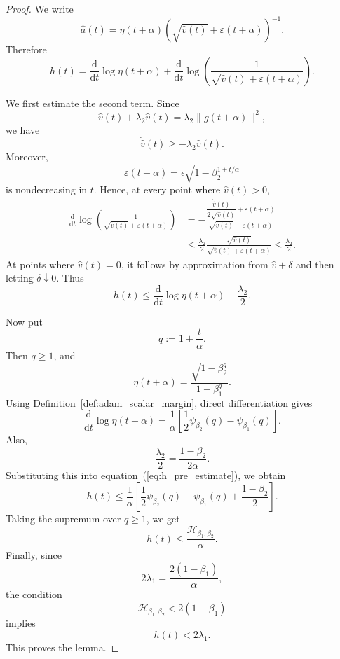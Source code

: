 \documentclass{article} %
\begin{document}
\begin{proof}
We write
\[
    \widehat a(t)
    =
    \eta(t+\alpha)
    \left(\sqrt{\widehat v(t)}+\varepsilon(t+\alpha)\right)^{-1}.
\]
Therefore
\[
    h(t)
    =
    \frac{\mathrm d}{\mathrm dt}\log\eta(t+\alpha)
    +
    \frac{\mathrm d}{\mathrm dt}
    \log
    \left(
        \frac{1}{\sqrt{\widehat v(t)}+\varepsilon(t+\alpha)}
    \right).
\]

We first estimate the second term. Since
\[
    \dot{\widehat v}(t)+\lambda_2\widehat v(t)
    =
    \lambda_2\|g(t+\alpha)\|^2,
\]
we have
\[
    \dot{\widehat v}(t)\geq -\lambda_2\widehat v(t).
\]
Moreover,
\[
    \varepsilon(t+\alpha)
    =
    \epsilon\sqrt{1-\beta_2^{1+t/\alpha}}
\]
is nondecreasing in \(t\). Hence, at every point where \(\widehat v(t)>0\),
\[
\begin{aligned}
    \frac{\mathrm d}{\mathrm dt}
    \log
    \left(
        \frac{1}{\sqrt{\widehat v(t)}+\varepsilon(t+\alpha)}
    \right)
    &=
    -
    \frac{
        \dfrac{\dot{\widehat v}(t)}{2\sqrt{\widehat v(t)}}
        +
        \dot\varepsilon(t+\alpha)
    }
    {
        \sqrt{\widehat v(t)}+\varepsilon(t+\alpha)
    }\\
    &\leq
    \frac{\lambda_2}{2}
    \frac{\sqrt{\widehat v(t)}}
    {\sqrt{\widehat v(t)}+\varepsilon(t+\alpha)}
    \leq
    \frac{\lambda_2}{2}.
\end{aligned}
\]
At points where \(\widehat v(t)=0\), it follows by approximation from \(\widehat v+\delta\) and then letting \(\delta\downarrow0\). Thus
\begin{equation}\label{eq:h_pre_estimate}
    h(t)
    \leq
    \frac{\mathrm d}{\mathrm dt}\log\eta(t+\alpha)
    +
    \frac{\lambda_2}{2}.
\end{equation}

Now put
\[
    q:=1+\frac{t}{\alpha}.
\]
Then \(q\geq1\), and
\[
    \eta(t+\alpha)
    =
    \frac{\sqrt{1-\beta_2^q}}
    {1-\beta_1^q}.
\]
Using Definition~\ref{def:adam_scalar_margin}, direct differentiation gives
\[
    \frac{\mathrm d}{\mathrm dt}\log\eta(t+\alpha)
    =
    \frac1\alpha
    \left[
        \frac12\psi_{\beta_2}(q)
        -
        \psi_{\beta_1}(q)
    \right].
\]
Also,
\[
    \frac{\lambda_2}{2}
    =
    \frac{1-\beta_2}{2\alpha}.
\]
Substituting this into equation~(\ref{eq:h_pre_estimate}), we obtain
\[
    h(t)
    \leq
    \frac1\alpha
    \left[
        \frac12\psi_{\beta_2}(q)
        -
        \psi_{\beta_1}(q)
        +
        \frac{1-\beta_2}{2}
    \right].
\]
Taking the supremum over \(q\geq1\), we get
\[
    h(t)
    \leq
    \frac{\mathcal H_{\beta_1,\beta_2}}{\alpha}.
\]
Finally, since
\[
    2\lambda_1
    =
    \frac{2(1-\beta_1)}{\alpha},
\]
the condition
\[
    \mathcal H_{\beta_1,\beta_2}<2(1-\beta_1)
\]
implies
\[
    h(t)
    <
    2\lambda_1.
\]
This proves the lemma.
\end{proof}
\end{document}
